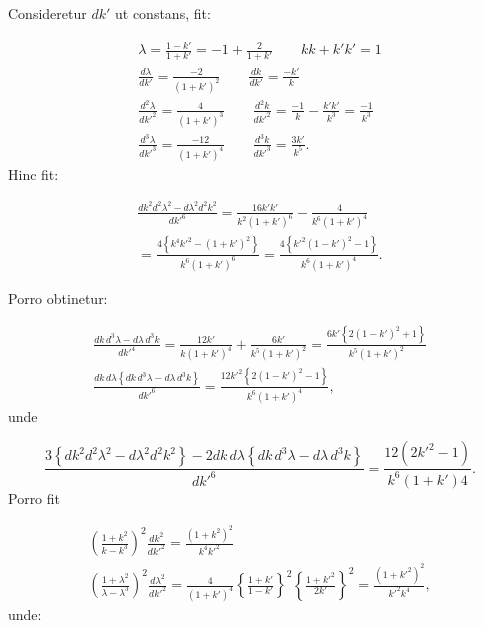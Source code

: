\documentclass{article}
\begin{document}
Consideretur $dk'$ ut constans, fit:

\[
\begin{gathered}
\lambda=\frac{1-k'}{1+k'}=-1+\frac{2}{1+k'}\qquad kk+k'k'=1\\[1.5ex]
\frac{d\lambda}{dk'}=\frac{-2}{(1+k')^{2}}\qquad\frac{dk}{dk'}=\frac{-k'}{k}\\[1.5ex]
\frac{d^{2}\lambda}{dk'^{2}}=\frac{4}{(1+k')^{3}}\qquad\frac{d^{2}k}{dk'^{2}}=\frac{-1}{k}-\frac{k'k'}{k^{3}}=\frac{-1}{k^{3}}\\[1.5ex]
\frac{d^{3}\lambda}{dk'^{3}}=\frac{-12}{(1+k')^{4}}\qquad\frac{d^{3}k}{dk'^{3}}=\frac{3k'}{k^{5}}.
\end{gathered}
\]
Hinc fit:

\[
\begin{gathered}
\frac{dk^{2}d^{2}\lambda^{2}-d\lambda^{2}d^{2}k^{2}}{dk'^{6}}=\frac{16k'k'}{k^{2}(1+k')^{6}}-\frac{4}{k^{6}(1+k')^{4}}\\[1.5ex]
=\frac{4\left\{k^{4}k'^{2}-(1+k')^{2}\right\}}{k^{6}(1+k')^{6}}=\frac{4\left\{k'^{2}(1-k')^{2}-1\right\}}{k^{6}(1+k')^{4}}.
\end{gathered}
\]

Porro obtinetur:

\[
\begin{gathered}
\frac{dk\,d^{3}\lambda-d\lambda\,d^{3}k}{dk'^{4}}=\frac{12k'}{k(1+k')^{4}}+\frac{6k'}{k^{5}(1+k')^{2}}=\frac{6k'\left\{2(1-k')^{2}+1\right\}}{k^{5}(1+k')^{2}}\\[1.5ex]
\frac{dk\,d\lambda\left\{dk\,d^{3}\lambda-d\lambda\,d^{3}k\right\}}{dk'^{6}}=\frac{12k'^{2}\left\{2(1-k')^{2}-1\right\}}{k^{6}(1+k')^{4}},
\end{gathered}
\]
unde

\[
\frac{3\left\{dk^{2}d^{2}\lambda^{2}-d\lambda^{2}d^{2}k^{2}\right\}-2dk\,d\lambda\left\{dk\,d^{3}\lambda-d\lambda\,d^{3}k\right\}}{dk'^{6}}=\frac{12(2k'^{2}-1)}{k^{6}(1+k')4}.
\]
Porro fit

\[
\begin{gathered}
\left(\frac{1+k^{2}}{k-k^{3}}\right)^{2}\frac{dk^{2}}{dk'^{2}}=\frac{(1+k^{2})^{2}}{k^{4}k'^{2}}\\[1.5ex]
\left(\frac{1+\lambda^{2}}{\lambda-\lambda^{3}}\right)^{2}\frac{d\lambda^{2}}{dk'^{2}}=\frac{4}{(1+k')^{4}}\left\{\frac{1+k'}{1-k'}\right\}^{2}\left\{\frac{1+k'^{2}}{2k'}\right\}^{2}=\frac{(1+k'^{2})^{2}}{k'^{2}k^{4}},
\end{gathered}
\]
unde:
\end{document}
